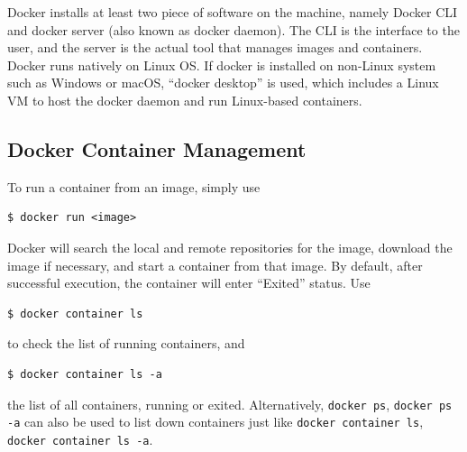 Docker installs at least two piece of software on the machine, namely Docker CLI and docker server (also known as docker daemon). The CLI is the interface to the user, and the server is the actual tool that manages images and containers. Docker runs natively on Linux OS. If docker is installed on non-Linux system such as Windows or macOS, ``docker desktop'' is used, which includes a Linux VM to host the docker daemon and run Linux-based containers.

\subsection{Docker Container Management}

To run a container from an image, simply use
\begin{lstlisting}
$ docker run <image>
\end{lstlisting}
Docker will search the local and remote repositories for the image, download the image if necessary, and start a container from that image. By default, after successful execution, the container will enter ``Exited'' status. Use
\begin{lstlisting}
$ docker container ls
\end{lstlisting}
to check the list of running containers, and
\begin{lstlisting}
$ docker container ls -a
\end{lstlisting}
the list of all containers, running or exited. Alternatively, \verb|docker ps|, \verb|docker ps -a| can also be used to list down containers just like \verb|docker container ls|, \verb|docker container ls -a|.

